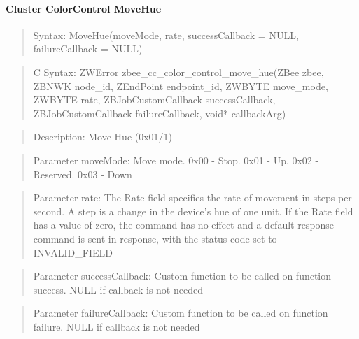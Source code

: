 \paragraph{Cluster ColorControl MoveHue}
\begin{quote}Syntax: MoveHue(moveMode, rate, successCallback = NULL, failureCallback = NULL)\end{quote}
\begin{quote}C Syntax: ZWError zbee\_cc\_color\_control\_move\_hue(ZBee zbee, ZBNWK node\_id, ZEndPoint endpoint\_id, ZWBYTE move\_mode, ZWBYTE rate, ZBJobCustomCallback successCallback, ZBJobCustomCallback failureCallback, void* callbackArg)\end{quote}
\begin{quote}Description: Move Hue (0x01/1)\end{quote}
\begin{quote}Parameter moveMode: Move mode. 0x00 - Stop. 0x01 - Up. 0x02 - Reserved. 0x03 - Down\end{quote}
\begin{quote}Parameter rate: The Rate field specifies the rate of movement in steps per second. A step is a change in the device’s hue of one unit. If the Rate field has a value of zero, the command has no effect and a default response command is sent in response, with the status code set to INVALID\_FIELD\end{quote}
\begin{quote}Parameter successCallback: Custom function to be called on function success. NULL if callback is not needed\end{quote}
\begin{quote}Parameter failureCallback: Custom function to be called on function failure. NULL if callback is not needed\end{quote}


